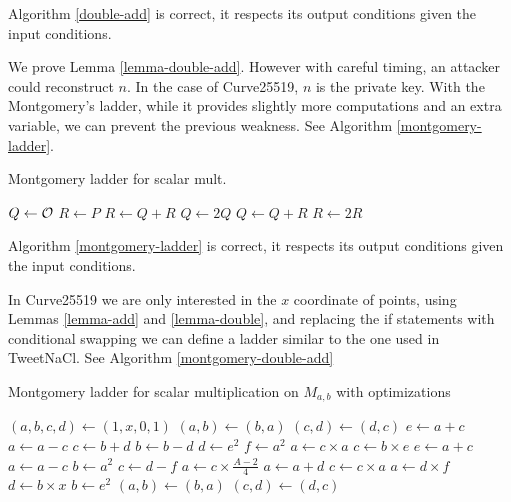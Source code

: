 \begin{lemma}
\label{lemma-double-add}
Algorithm \ref{double-add} is correct, \ie it respects its output conditions given the input conditions.
\end{lemma}

We prove Lemma \ref{lemma-double-add}. However with careful timing, an attacker could reconstruct $n$.
In the case of Curve25519, $n$ is the private key. With the Montgomery's ladder, while it provides slightly more computations and an extra variable, we can prevent the previous weakness.
See Algorithm \ref{montgomery-ladder}.

\begin{algorithm}[H]
\caption{Montgomery ladder for scalar mult.}
\label{montgomery-ladder}
\begin{algorithmic}
\STATE $Q \leftarrow \mathcal{O}$
\STATE $R \leftarrow P$
    \STATE $R \leftarrow Q + R$
    \STATE $Q \leftarrow 2Q$
  \ELSE
    \STATE $Q \leftarrow Q + R$
    \STATE $R \leftarrow 2R$
  \ENDIF
\ENDFOR
\end{algorithmic}
\end{algorithm}

\begin{lemma}
\label{lemma-montgomery-ladder}
Algorithm \ref{montgomery-ladder} is correct, \ie it respects its output conditions given the input conditions.
\end{lemma}

In Curve25519 we are only interested in the $x$ coordinate of points, using Lemmas \ref{lemma-add} and \ref{lemma-double}, and replacing the if statements with conditional swapping we can define a ladder similar to the one used in TweetNaCl. See Algorithm \ref{montgomery-double-add}

\begin{algorithm}[H]
\caption{Montgomery ladder for scalar multiplication on $M_{a,b}$ with optimizations}
\label{montgomery-double-add}
\begin{algorithmic}
\STATE $(a,b,c,d) \leftarrow (1,x,0,1)$
    \STATE $(a,b) \leftarrow (b,a)$
    \STATE $(c,d) \leftarrow (d,c)$
  \ENDIF
  \STATE $e \leftarrow a + c$
  \STATE $a \leftarrow a - c$
  \STATE $c \leftarrow b + d$
  \STATE $b \leftarrow b - d$
  \STATE $d \leftarrow e^2$
  \STATE $f \leftarrow a^2$
  \STATE $a \leftarrow c \times a$
  \STATE $c \leftarrow b \times e$
  \STATE $e \leftarrow a + c$
  \STATE $a \leftarrow a - c$
  \STATE $b \leftarrow a^2$
  \STATE $c \leftarrow d-f$
  \STATE $a \leftarrow c\times\frac{A - 2}{4}$
  \STATE $a \leftarrow a + d$
  \STATE $c \leftarrow c \times a$
  \STATE $a \leftarrow d \times f$
  \STATE $d \leftarrow b \times x$
  \STATE $b \leftarrow e^2$
    \STATE $(a,b) \leftarrow (b,a)$
    \STATE $(c,d) \leftarrow (d,c)$
  \ENDIF
\ENDFOR
\end{algorithmic}
\end{algorithm}

